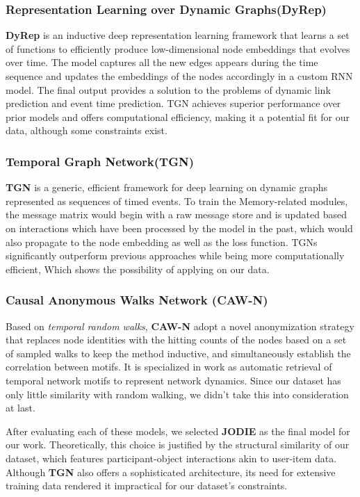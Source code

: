 \subsubsection{Representation Learning over Dynamic Graphs(DyRep)}
\textbf{DyRep}\cite{trivedi2018representation} is an inductive deep representation learning framework that learns a set of functions to efficiently produce low-dimensional node embeddings that evolves over time. The model captures all the new edges appears during the time sequence and updates the embeddings of the nodes accordingly in a custom RNN model. The final output provides a solution to the problems of dynamic link prediction and event time prediction. TGN achieves superior performance over prior models and offers computational efficiency, making it a potential fit for our data, although some constraints exist.


\subsubsection{Temporal Graph Network(TGN)}
\textbf{TGN}\cite{rossi2006temporal} is a generic, efficient framework for deep learning on dynamic graphs represented as sequences of timed events. To train the Memory-related modules, the message matrix would begin with a raw message store and is updated based on interactions which have been processed by the model in the past, which would also propagate to the node embedding as well as the loss function. TGNs significantly outperform previous approaches while being more computationally efficient, Which shows the possibility of applying on our data.

\subsubsection{Causal Anonymous Walks Network (CAW-N)}
Based on \textit{temporal random walks}, \textbf{CAW-N} adopt a novel anonymization strategy that replaces node identities with the hitting counts of the nodes based on a set of sampled walks to keep the method inductive, and simultaneously establish the correlation between motifs. It is specialized in work as automatic retrieval of temporal network motifs to represent network dynamics. Since our dataset has only little similarity with random walking, we didn't take this into consideration at last.


After evaluating each of these models, we selected \textbf{JODIE} as the final model for our work. Theoretically, this choice is justified by the structural similarity of our dataset, which features participant-object interactions akin to user-item data. Although \textbf{TGN } also offers a sophisticated architecture, its need for extensive training data rendered it impractical for our dataset's constraints.